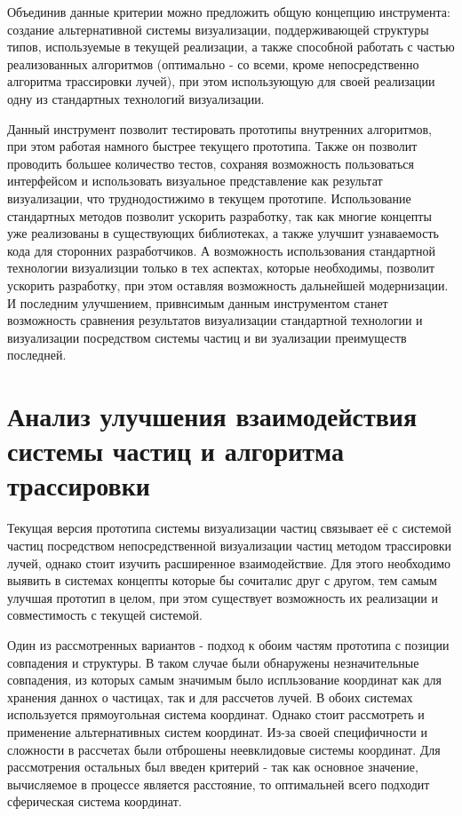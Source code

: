 Объединив данные критерии можно предложить общую концепцию инструмента: создание альтернативной системы визуализации, поддерживающей структуры типов, используемые в текущей реализации, а также способной работать с частью реализованных алгоритмов (оптимально - со всеми, кроме непосредственно алгоритма трассировки лучей), при этом использующую для своей реализации одну из стандартных технологий визуализации. 

Данный инструмент позволит тестировать прототипы внутренних алгоритмов, при этом работая намного быстрее текущего прототипа. Также он позволит проводить большее количество тестов, сохраняя возможность пользоваться интерфейсом и использовать визуальное представление как результат визуализации, что труднодостижимо в текущем прототипе. Использование стандартных методов позволит ускорить разработку, так как многие концепты уже реализованы в существующих библиотеках, а также улучшит узнаваемость кода для сторонних разработчиков. А возможность использования стандартной технологии визуализции только в тех аспектах, которые необходимы, позволит ускорить разработку, при этом оставляя возможность дальнейшей модернизации. И последним улучшением, привнсимым данным инструментом станет возможность сравнения результатов визуализации стандартной технологии и  визуализации посредством системы частиц и ви зуализации преимуществ последней.

\section{Анализ улучшения взаимодействия системы частиц и алгоритма трассировки}

Текущая версия прототипа системы визуализации частиц связывает её с системой частиц посредством непосредственной визуализации частиц методом трассировки лучей, однако стоит изучить расширенное взаимодействие. Для этого необходимо выявить в системах концепты которые бы сочиталис друг с другом, тем самым улучшая прототип в целом, при этом существует возможность их реализации и совместимость с текущей системой.

Один из рассмотренных вариантов - подход к обоим частям прототипа с позиции совпадения и  структуры. В таком случае были обнаружены незначительные совпадения, из которых самым значимым было испльзование координат как для хранения даннох о частицах, так и для рассчетов лучей. В обоих системах используется прямоугольная система координат. Однако стоит рассмотреть и применение альтернативных систем координат. Из-за своей специфичности и сложности в рассчетах были отброшены неевклидовые системы координат. Для рассмотрения остальных был введен критерий - так как основное значение, вычисляемое в процессе является расстояние, то оптимальней всего  подходит сферическая система координат.

